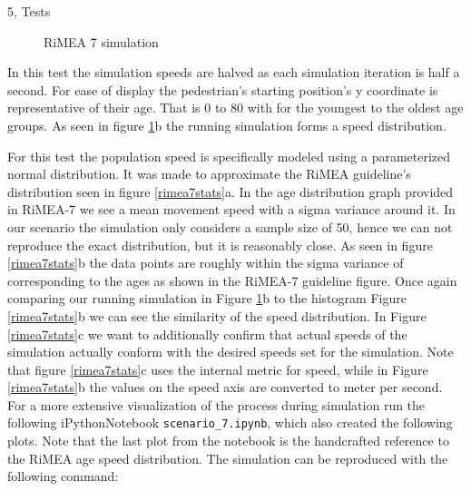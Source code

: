 \begin{task}{5, Tests}
\begin{figure}[H]
\caption{RiMEA 7 simulation}
\label{rimea7simul}
\end{figure}

In this test the simulation speeds are halved as each simulation iteration is half a second. For ease of display the pedestrian's starting position's y coordinate is representative of their age. That is 0 to 80 with for the youngest to the oldest age groups. As seen in figure \ref{rimea7simul}b the running simulation forms a speed distribution.

For this test the population speed is specifically modeled using a parameterized normal distribution. It was made to approximate the RiMEA guideline's distribution seen in figure \ref{rimea7stats}a. In the age distribution graph provided in RiMEA-7 we see a mean movement speed with a sigma variance around it. In our scenario the simulation only considers a sample size of 50, hence we can not reproduce the exact distribution, but it is reasonably close. As seen in figure \ref{rimea7stats}b the data points are roughly within the sigma variance of corresponding to the ages as shown in the RiMEA-7 guideline figure. Once again comparing our running simulation in Figure \ref{rimea7simul}b to the histogram Figure \ref{rimea7stats}b we can see the similarity of the speed distribution. In Figure \ref{rimea7stats}c we want to additionally confirm that actual speeds of the simulation actually conform with the desired speeds set for the simulation. Note that figure \ref{rimea7stats}c uses the internal metric for speed, while in Figure \ref{rimea7stats}b the values on the speed axis are converted to meter per second. For a more extensive visualization of the process during simulation run the following iPythonNotebook \texttt{scenario\_7.ipynb}, which also created the following plots. Note that the last plot from the notebook is the handcrafted reference to the RiMEA age speed distribution. The simulation can be reproduced with the following command:


\end{task}
